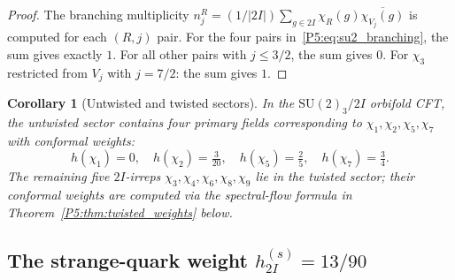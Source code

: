 \documentclass[11pt,a4paper]{article}
\newtheorem{corollary}[theorem]{Corollary}
\theoremstyle{definition}
\theoremstyle{remark}
\begin{document}
\begin{proof}
The branching multiplicity $n_j^R = (1/|2I|)\sum_{g\in 2I} \chi_R(g)\overline{\chi_{V_j}(g)}$
is computed for each $(R,j)$ pair.  For the four pairs in~\eqref{P5:eq:su2_branching},
the sum gives exactly $1$.  For all other pairs with $j \leq 3/2$, the sum
gives $0$.  For $\chi_3$ restricted from $V_j$ with $j = 7/2$: the sum gives $1$.
\end{proof}

\begin{corollary}[Untwisted and twisted sectors]
\label{P5:cor:sectors}
In the $\mathrm{SU}(2)_3/2I$ orbifold CFT, the \emph{untwisted} sector
contains four primary fields corresponding to $\chi_1,\chi_2,\chi_5,\chi_7$
with conformal weights:
\begin{equation}
  h(\chi_1)=0, \quad
  h(\chi_2)=\tfrac{3}{20}, \quad
  h(\chi_5)=\tfrac{2}{5}, \quad
  h(\chi_7)=\tfrac{3}{4}.
  \label{P5:eq:untwisted_weights}
\end{equation}
The remaining five $2I$-irreps $\chi_3,\chi_4,\chi_6,\chi_8,\chi_9$
lie in the \emph{twisted sector}; their conformal weights are computed
via the spectral-flow formula in Theorem~\ref{P5:thm:twisted_weights} below.
\end{corollary}

\subsection{The strange-quark weight $h_{2I}^{(s)} = 13/90$}
\end{document}
